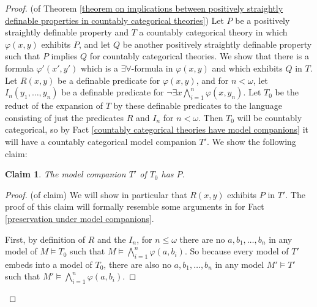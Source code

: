 \documentclass[10pt,a4paper]{amsart}
\newtheorem{claim}{Claim}
\begin{document}
\begin{proof}(of Theorem \ref{theorem on implications between positively straightly definable properties in countably categorical theories}) Let $P$ be a positively straightly definable property and $T$ a countably categorical theory in which $\varphi(x, y)$ exhibits $P$, and let $Q$ be another positively straightly definable property such that $P$ implies $Q$ for countably categorical theories. We show that there is a formula $\varphi'(x', y')$ which is a $\exists\forall$-formula in $\varphi(x, y)$ and which exhibits $Q$ in $T$. Let $R(x,y)$ be a definable predicate for $\varphi(x,y)$, and for $n < \omega$, let $I_{n}(y_{1}, \ldots, y_{n})$ be a definable predicate for $\neg \exists x \bigwedge^{n}_{i=1} \varphi(x, y_{n})$. Let $T_{0}$ be the reduct of the expansion of $T$ by these definable predicates to the language consisting of just the predicates $R$ and $I_{n}$ for $n < \omega$. Then $T_{0}$ will be countably categorical, so by Fact \ref{countably categorical theories have model companions} it will have a countably categorical model companion $T'$. We show the following claim:

\begin{claim}
The model companion $T'$ of $T_{0}$ has $P$.
\end{claim}

\begin{proof}(of claim)
We will show in particular that $R(x, y)$ exhibits $P$ in $T'$. The proof of this claim will formally resemble some arguments in \cite{bodirsky2025taking} for Fact \ref{preservation under model companions}.

First, by definition of $R$ and the $I_{n}$, for $n \leq \omega$ there are no $a, b_{1}, \ldots, b_{n}$ in any model of $M\models T_{0}$ such that $M \models \bigwedge^{n}_{i=1} \varphi(a, b_{i})$. So because every model of $T'$ embeds into a model of $T_{0}$, there are also no $a, b_{1}, \ldots, b_{n}$ in any model $M' \models T'$ such that $M' \models \bigwedge^{n}_{i=1} \varphi(a, b_{i})$. 


\end{proof}
\end{proof}
\end{document}

